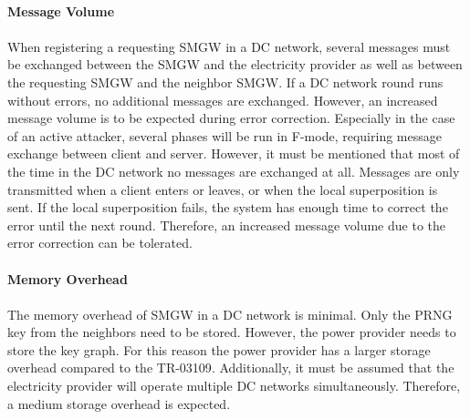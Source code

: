 \\
\textbf{Message Volume}
\\
\\
When registering a requesting \gls{SMGW} in a DC network, several messages must be exchanged between the \gls{SMGW} and the electricity provider as well as between the requesting \gls{SMGW} and the neighbor \gls{SMGW}. If a DC network round runs without errors, no additional messages are exchanged.
However, an increased message volume is to be expected during error correction. Especially in the case of an active attacker, several phases will be run in F-mode, requiring message exchange between client and server. However, it must be mentioned that most of the time in the DC network no messages are exchanged at all. Messages are only transmitted when a client enters or leaves, or when the local superposition is sent. If the local superposition fails, the system has enough time to correct the error until the next round. Therefore, an increased message volume due to the error correction can be tolerated.\\
\\
\textbf{Memory Overhead}
\\
\\
The memory overhead of \gls{SMGW} in a DC network is minimal. Only the \gls{PRNG} key from the neighbors need to be stored. However, the power provider needs to store the key graph. For this reason the power provider has a larger storage overhead compared to the \gls{TR-03109}. Additionally, it must be assumed that the electricity provider will operate multiple DC networks simultaneously. Therefore, a medium storage overhead is expected.

